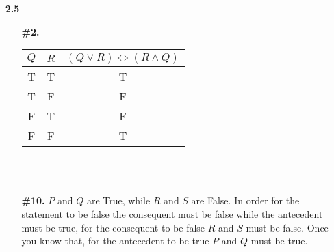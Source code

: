 \documentclass[16pt]{article}
\begin{document}
\begin{enumerate}
\begin{enumerate}
    \end{enumerate}
    \item[\textbf{2.5  }]
    \begin{enumerate}
        \item[\textbf{\#2.}]
        \begin{tabular}{|c|c|c|}
            \hline
            $Q$ & $R$ & $(Q\lor R)\Leftrightarrow (R\land Q)$\\
            \hline
            T & T & T \\
            \hline
            T & F & F \\
            \hline
            F & T & F \\
            \hline
            F & F & T \\
            \hline
        \end{tabular}
        \\ \\
        \item[\textbf{\#10.}] $P$ and $Q$ are True, while $R$ and $S$ are False. In order for the statement to be false the consequent must be false while the antecedent must be true, for the consequent to be false $R$ and $S$ must be false. Once you know that, for the antecedent to be true $P$ and $Q$ must be true.
    \end{enumerate}


\end{enumerate}
\end{document}
